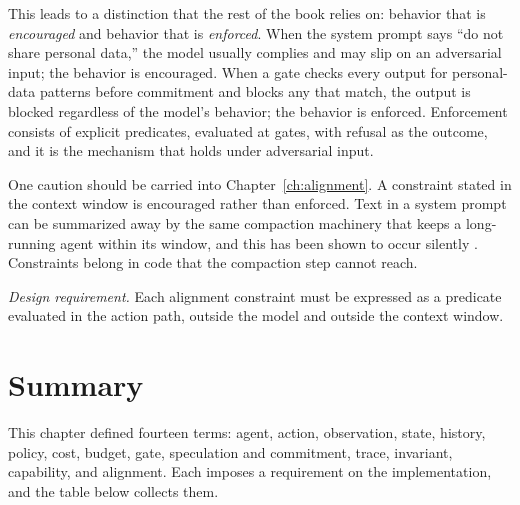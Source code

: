 \documentclass[11pt]{book}
\begin{document}
This leads to a distinction that the rest of the book relies on: behavior that is \textit{encouraged} and behavior that is \textit{enforced}. When the system prompt says ``do not share personal data,'' the model usually complies and may slip on an adversarial input; the behavior is encouraged. When a gate checks every output for personal-data patterns before commitment and blocks any that match, the output is blocked regardless of the model's behavior; the behavior is enforced. Enforcement consists of explicit predicates, evaluated at gates, with refusal as the outcome, and it is the mechanism that holds under adversarial input.

One caution should be carried into Chapter~\ref{ch:alignment}. A constraint stated in the context window is encouraged rather than enforced. Text in a system prompt can be summarized away by the same compaction machinery that keeps a long-running agent within its window, and this has been shown to occur silently \cite{govdecay2026}. Constraints belong in code that the compaction step cannot reach.

\textit{Design requirement.} Each alignment constraint must be expressed as a predicate evaluated in the action path, outside the model and outside the context window.

\section{Summary}

This chapter defined fourteen terms: agent, action, observation, state, history, policy, cost, budget, gate, speculation and commitment, trace, invariant, capability, and alignment. Each imposes a requirement on the implementation, and the table below collects them.
\end{document}
